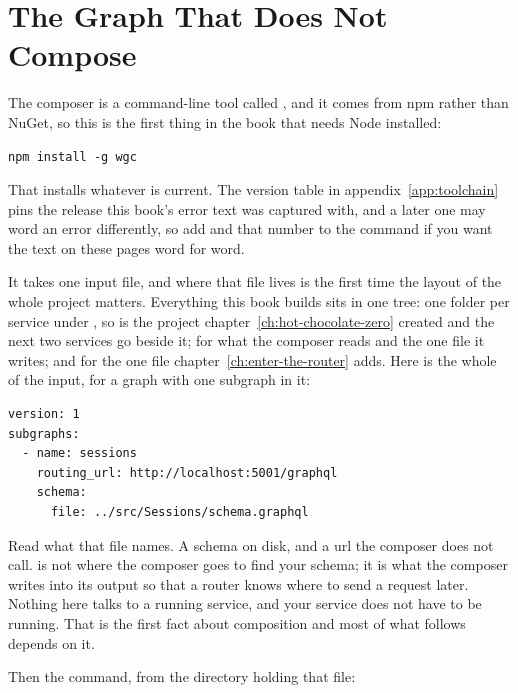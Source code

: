 \section{The Graph That Does Not Compose}
\label{sec:ch07-the-graph-that-does-not-compose}

%
%
The composer is a command-line tool called , and it comes from npm
rather than NuGet, so this is the first thing in the book that needs Node
installed:

\begin{verbatim}
npm install -g wgc
\end{verbatim}

That installs whatever is current. The version table in
appendix~\ref{app:toolchain} pins the release this book's error text was
captured with, and a later one may word an error differently, so add 
and that number to the command if you want the text on these pages word for
word.

%
It takes one input file, and where that file lives is the first time the
layout of the whole project matters. Everything this book builds sits in one
tree: one folder per service under , so  is the
project chapter~\ref{ch:hot-chocolate-zero} created and the next two services
go beside it;  for what the composer reads and the one file it
writes; and  for the one file chapter~\ref{ch:enter-the-router}
adds. Here is the whole of the input, for a
graph with one subgraph in it:

\begin{verbatim}
version: 1
subgraphs:
  - name: sessions
    routing_url: http://localhost:5001/graphql
    schema:
      file: ../src/Sessions/schema.graphql
\end{verbatim}

%
Read what that file names. A schema on disk, and a url the composer does not
call.  is not where the composer goes to find your schema;
it is what the composer writes into its output so that a router knows where to
send a request later. Nothing here talks to a running service, and your service
does not have to be running. That is the first fact about composition and most
of what follows depends on it.

%
Then the command, from the directory holding that file:

